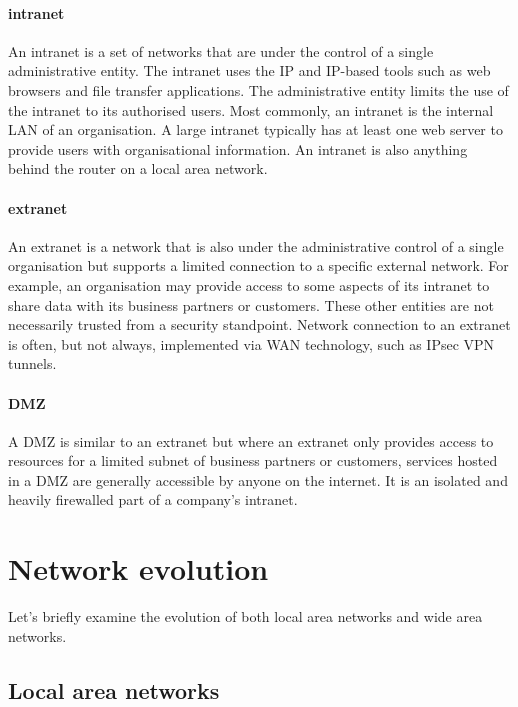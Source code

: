 {\paragraph{intranet}
An intranet is a set of networks that are under the control of a single administrative entity.
The intranet uses the \gls{IP} and \gls{IP}-based tools such as web browsers and file transfer applications.
The administrative entity limits the use of the intranet to its authorised users.
Most commonly, an intranet is the internal \gls{LAN} of an organisation.
A large intranet typically has at least one web server to provide users with organisational information.
An intranet is also anything behind the router on a local area network.

\paragraph{extranet}
An extranet is a network that is also under the administrative control of a single organisation but supports a limited connection to a specific external network.
For example, an organisation may provide access to some aspects of its intranet to share data with its business partners or customers.
These other entities are not necessarily trusted from a security standpoint.
Network connection to an extranet is often, but not always, implemented via \gls{WAN} technology, such as IPsec \acs{VPN} tunnels.

\paragraph{\gls{DMZ}}
A \gls{DMZ} is similar to an extranet but where an extranet only provides access to resources for a limited subnet of business partners or customers, services hosted in a \gls{DMZ} are generally accessible by anyone on the internet.
It is an isolated and heavily firewalled part of a company's intranet.

\section{Network evolution}
\label{sec:network-evolution}

Let's briefly examine the evolution of both local area networks and wide area networks.

\subsection{Local area networks}
\label{sec:network-evolution-lan}

}
